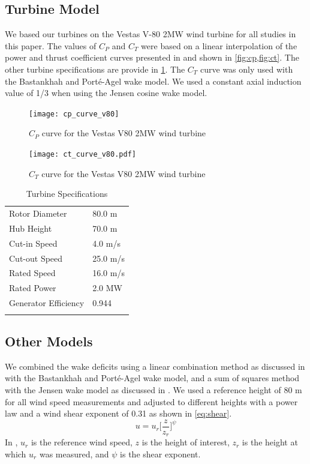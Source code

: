 \documentclass{jpconf}
\begin{document}
\subsection{Turbine Model}
We based our turbines on the Vestas V-80 2MW wind turbine for all studies in this paper. The values of $C_P$ and $C_T$ were based on a linear interpolation of the power and thrust coefficient curves presented in \cite{niayifar2016} and shown in \cref{fig:cp,fig:ct}. The other turbine specifications are provide in \cref{tab:v80}. The $C_T$ curve was only used with the Bastankhah and Port\'e-Agel wake model. We used a constant axial induction value of 1/3 when using the Jensen cosine wake model.
%
\begin{figure}[h!]
	\centering
	\begin{minipage}[t]{0.48\textwidth}
		\centering
		\texttt{[image: cp\_curve\_v80]}
		\caption{$C_P$ curve for the Vestas V80 2MW wind turbine \cite{niayifar2016} }
		\label{fig:cp}
	\end{minipage}\hspace{1pc}%
	\begin{minipage}[t]{0.48\textwidth}
		\centering
		\texttt{[image: ct\_curve\_v80.pdf]}
		\caption{$C_T$ curve for the Vestas V80 2MW wind turbine \cite{niayifar2016}}
		\label{fig:ct}
	\end{minipage} 
\end{figure}
%
\begin{table}[h!]
	\caption{Turbine Specifications}
	\label{tab:v80}
	\centering
	\begin{tabular}{l l}
		\br
		Rotor Diameter & 80.0 m\\
		Hub Height & 70.0 m \\
		Cut-in Speed & 4.0 m/s\\
		Cut-out Speed & 25.0 m/s \\
		Rated Speed & 16.0 m/s \\
		Rated Power & 2.0 MW \\
		Generator Efficiency & 0.944 \\
		\br
	\end{tabular}
\end{table}

\subsection{Other Models}
We combined the wake deficits using a linear combination method as discussed in \cite{niayifar2016} with the Bastankhah and Port\'e-Agel wake model, and a sum of squares method with the Jensen wake model as discussed in \cite{katic1986}. We used a reference height of 80 m for all wind speed measurements and adjusted to different heights with a power law and a wind shear exponent of 0.31 as shown in \cref{eq:shear}. 
%
\begin{equation} \label{eq:shear}
u = u_r\bigg[\frac{z}{z_r}\bigg]^\psi
\end{equation}
%
In , $u_r$ is the reference wind speed, $z$ is the height of interest, $z_r$ is the height at which $u_r$ was measured, and $\psi$ is the shear exponent.
\end{document}
